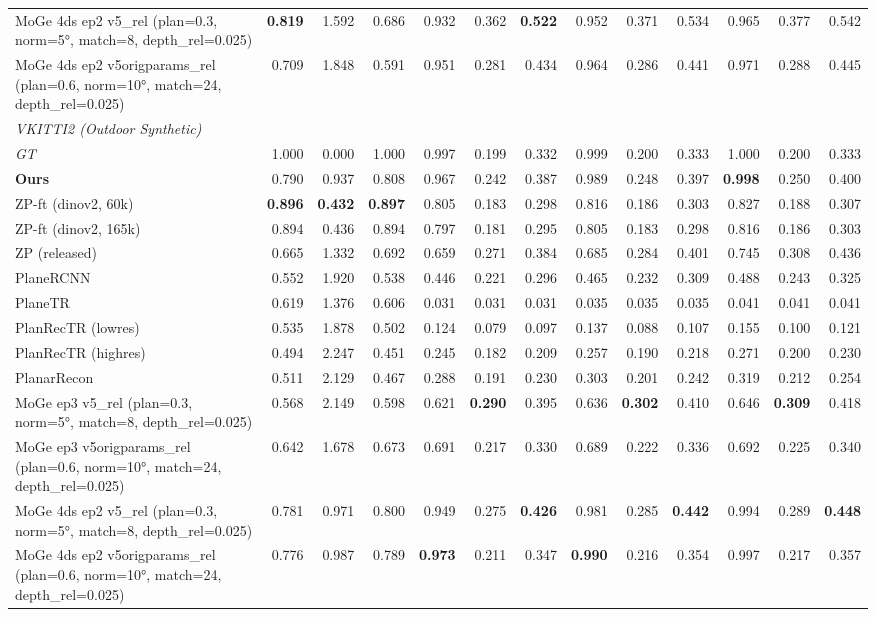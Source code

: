 \begin{table}[H]
{\begin{tabular}{l r r r r r r r r r r r r}
MoGe 4ds ep2 v5\_rel (plan=0.3, norm=5°, match=8, depth\_rel=0.025) & \textbf{0.819} & 1.592 & 0.686 & 0.932 & 0.362 & \textbf{0.522} & 0.952 & 0.371 & 0.534 & 0.965 & 0.377 & 0.542 \\
MoGe 4ds ep2 v5origparams\_rel (plan=0.6, norm=10°, match=24, depth\_rel=0.025) & 0.709 & 1.848 & 0.591 & 0.951 & 0.281 & 0.434 & 0.964 & 0.286 & 0.441 & 0.971 & 0.288 & 0.445 \\
\midrule
\multicolumn{13}{l}{\textit{VKITTI2 (Outdoor Synthetic)}} \\
\midrule
\textit{GT} & 1.000 & 0.000 & 1.000 & 0.997 & 0.199 & 0.332 & 0.999 & 0.200 & 0.333 & 1.000 & 0.200 & 0.333 \\
\textbf{Ours} & 0.790 & 0.937 & 0.808 & 0.967 & 0.242 & 0.387 & 0.989 & 0.248 & 0.397 & \textbf{0.998} & 0.250 & 0.400 \\
ZP-ft (dinov2, 60k) & \textbf{0.896} & \textbf{0.432} & \textbf{0.897} & 0.805 & 0.183 & 0.298 & 0.816 & 0.186 & 0.303 & 0.827 & 0.188 & 0.307 \\
ZP-ft (dinov2, 165k) & 0.894 & 0.436 & 0.894 & 0.797 & 0.181 & 0.295 & 0.805 & 0.183 & 0.298 & 0.816 & 0.186 & 0.303 \\
ZP (released) & 0.665 & 1.332 & 0.692 & 0.659 & 0.271 & 0.384 & 0.685 & 0.284 & 0.401 & 0.745 & 0.308 & 0.436 \\
PlaneRCNN & 0.552 & 1.920 & 0.538 & 0.446 & 0.221 & 0.296 & 0.465 & 0.232 & 0.309 & 0.488 & 0.243 & 0.325 \\
PlaneTR & 0.619 & 1.376 & 0.606 & 0.031 & 0.031 & 0.031 & 0.035 & 0.035 & 0.035 & 0.041 & 0.041 & 0.041 \\
PlanRecTR (lowres) & 0.535 & 1.878 & 0.502 & 0.124 & 0.079 & 0.097 & 0.137 & 0.088 & 0.107 & 0.155 & 0.100 & 0.121 \\
PlanRecTR (highres) & 0.494 & 2.247 & 0.451 & 0.245 & 0.182 & 0.209 & 0.257 & 0.190 & 0.218 & 0.271 & 0.200 & 0.230 \\
PlanarRecon & 0.511 & 2.129 & 0.467 & 0.288 & 0.191 & 0.230 & 0.303 & 0.201 & 0.242 & 0.319 & 0.212 & 0.254 \\
MoGe ep3 v5\_rel (plan=0.3, norm=5°, match=8, depth\_rel=0.025) & 0.568 & 2.149 & 0.598 & 0.621 & \textbf{0.290} & 0.395 & 0.636 & \textbf{0.302} & 0.410 & 0.646 & \textbf{0.309} & 0.418 \\
MoGe ep3 v5origparams\_rel (plan=0.6, norm=10°, match=24, depth\_rel=0.025) & 0.642 & 1.678 & 0.673 & 0.691 & 0.217 & 0.330 & 0.689 & 0.222 & 0.336 & 0.692 & 0.225 & 0.340 \\
MoGe 4ds ep2 v5\_rel (plan=0.3, norm=5°, match=8, depth\_rel=0.025) & 0.781 & 0.971 & 0.800 & 0.949 & 0.275 & \textbf{0.426} & 0.981 & 0.285 & \textbf{0.442} & 0.994 & 0.289 & \textbf{0.448} \\
MoGe 4ds ep2 v5origparams\_rel (plan=0.6, norm=10°, match=24, depth\_rel=0.025) & 0.776 & 0.987 & 0.789 & \textbf{0.973} & 0.211 & 0.347 & \textbf{0.990} & 0.216 & 0.354 & 0.997 & 0.217 & 0.357 \\
\bottomrule
\end{tabular}%
}
\end{table}